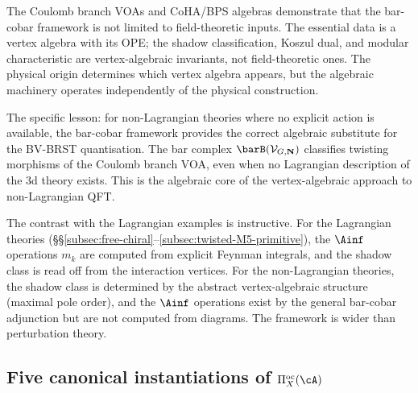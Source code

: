 \begin{remark}
\label{rem:non-lagrangian-lesson}
The Coulomb branch VOAs and CoHA/BPS algebras demonstrate that
the bar-cobar framework is not limited to field-theoretic inputs.
The essential data is a vertex algebra with its OPE; the shadow
classification, Koszul dual, and modular characteristic are
vertex-algebraic invariants, not field-theoretic ones. The physical
origin determines which vertex algebra appears, but the algebraic
machinery operates independently of the physical construction.

The specific lesson: for non-Lagrangian theories where no explicit
action is available, the bar-cobar framework provides the correct
algebraic substitute for the BV-BRST quantisation. The bar complex
$\barB(\mathcal{V}_{G,\mathbf{N}})$ classifies twisting morphisms
of the Coulomb branch VOA, even when no Lagrangian description of
the 3d theory exists. This is the algebraic core of the
vertex-algebraic approach to non-Lagrangian QFT.

The contrast with the Lagrangian examples is instructive. For
the Lagrangian theories
(\S\S\ref{subsec:free-chiral}--\ref{subsec:twisted-M5-primitive}),
the $\Ainf$ operations $m_k$ are computed from explicit Feynman
integrals, and the shadow class is read off from the interaction
vertices. For the non-Lagrangian theories, the shadow class is
determined by the abstract vertex-algebraic structure (maximal
pole order), and the $\Ainf$ operations exist by the general
bar-cobar adjunction but are not computed from diagrams. The
framework is wider than perturbation theory.
\end{remark}


%
%

\subsection{Five canonical instantiations of \texorpdfstring{$\Pi^{\mathrm{oc}}_X(\cA)$}{Pi\^oc\_X(A)}}
\label{subsec:five-platonic-instantiations}

